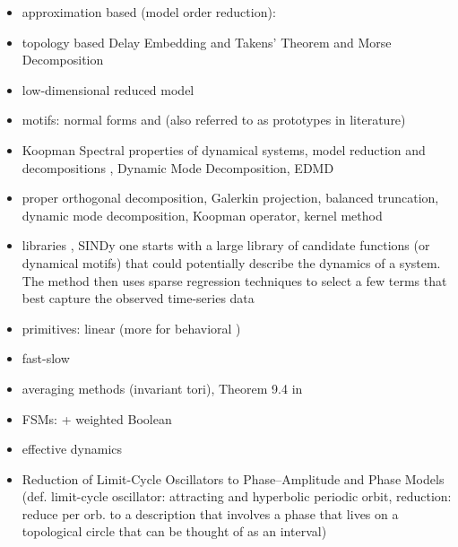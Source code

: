 \documentclass{article}
\theoremstyle{definition} \newtheorem{definition}{Definition}  \newtheorem{example}{Example}
\theoremstyle{remark} \newtheorem{remark}{Remark}
\newcounter{ct}
\begin{document}
\begin{itemize}
\item approximation based (model order reduction): \citep{schilders2008model}
\item topology based Delay Embedding and Takens' Theorem  and Morse Decomposition 
\item low-dimensional reduced model \citep{zemlianova2024dynamical} \citep{nonnenmacher2017extracting}
\item motifs: normal forms \citep{full1999templates} \citep{nayfeh2011normalforms} and \citep{bonilla2012discriminative} \citep{yair2017normalforms} (also referred to as prototypes in literature)
\item Koopman  Spectral properties of dynamical systems, model reduction and decompositions \citep{mezic2005spectral}, Dynamic Mode Decomposition\citep{rowley2009spectral}, EDMD \citep{mezic2005spectral}
\item proper orthogonal decomposition, Galerkin projection, balanced truncation, dynamic mode decomposition, Koopman operator, kernel method \citep{rowley2017model}
\item libraries \citep{brunton2014compressive}, SINDy  one starts with a large library of candidate functions (or dynamical motifs) that could potentially describe the dynamics of a system. The method then uses sparse regression techniques to select a few terms that best capture the observed time-series data \citep{brunton2016discovering, brunton2016sparse, fasel2022ensemble}
\item  primitives: linear \citep{kaul2020linear} (more for behavioral \citep{ijspeert2013dynamical})
\item fast-slow \citep{jones1995gspt} \citep{verhulst2006methods}  \citep{dsilva2016data} \citep{haller2017exact}
\item averaging methods \citep{sanders2007averaging} (invariant tori\citep{novaes2024invariant}), Theorem 9.4 in \citep{hoppensteadt2012weakly}
\item FSMs: \citep{giles1991extracting, casey1996dynamics, giles1999equivalence, oliva2019fsm, ceni2020excitable, cotteret2024fsm, aichernig2024learning} + weighted\citep{wei2024weighted} Boolean \citep{li2025dynamics}
\item effective dynamics \citep{menier2025interpretable}
\item Reduction of Limit-Cycle Oscillators to Phase–Amplitude and Phase Models \citep{ashwin2016mathematical} (def. limit-cycle oscillator: attracting and hyperbolic periodic orbit, reduction: reduce per orb. to a description that involves a phase that lives on a topological circle that can be thought of as an interval)

\end{itemize}
\end{document}
